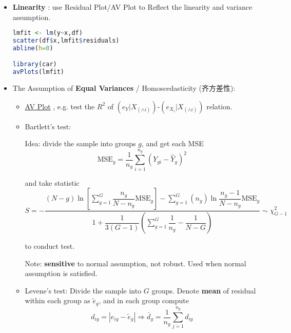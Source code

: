 \begin{itemize}[topsep=2pt,itemsep=2pt]
    \item \textbf{Linearity} : use Residual Plot/AV Plot to Reflect the linearity and variance assumption.
    
\begin{rcode}
\begin{lstlisting}[language=R]
lmfit <- lm(y~x,df)
scatter(df$x,lmfit$residuals)
abline(h=0)

library(car)
avPlots(lmfit)
\end{lstlisting}

\end{rcode}
    \item The Assumption of \textbf{Equal Variances} / Homoscedasticity (齐方差性): 
    \begin{itemize}[topsep=2pt,itemsep=2pt]
        \item \hyperlink{AVPlot}{AV Plot} , e.g. test the $ R^2 $ of $ (e_Y|X_{(\wedge i)} )$-$( e_{X_i}|X_{(\wedge i)}) $ relation.
        \item Bartlett's test:
        
        Idea: divide the sample into groups $ g $, and get each MSE
        \begin{equation}
             \mathrm{MSE}_g=\dfrac{1}{n_g}\sum_{i=1}^{n_g}(Y_{gi}-\hat{Y}_g)^2
        \end{equation}
        
        and take statistic
        \begin{equation}
            S=-\dfrac{(N-g)\ln\left[ \sum\limits_{g=1}^G \dfrac{n_g}{N-n_g}\mathrm{MSE}_g \right]-\sum\limits_{g=1}^G(n_g)\ln \dfrac{n_g-1}{N-n_g}\mathrm{MSE}_g }{1+\dfrac{1}{3(G-1)}\left(\sum\limits_{g=1}^G \dfrac{1}{n_g}-\dfrac{1}{N-G} \right)} \sim \chi^2_{G-1}
        \end{equation}

        to conduct test. 

        Note: \textbf{sensitive}  to normal assumption, not robust. Used when normal assumption is satisfied.
        \item Levene's test: Divide the sample into $ G $ groups. Denote \textbf{mean}  of residual within each group as $ \tilde{e}_g $, and in each group compute
        \begin{equation}
            d_{ig}=|e_{ig}-\tilde{e}_g| \Rightarrow \bar{d}_{g}=\dfrac{1}{n_g}\sum_{j=1}^{n_g}d_{ig}
        \end{equation}


\end{itemize}
\end{itemize}

